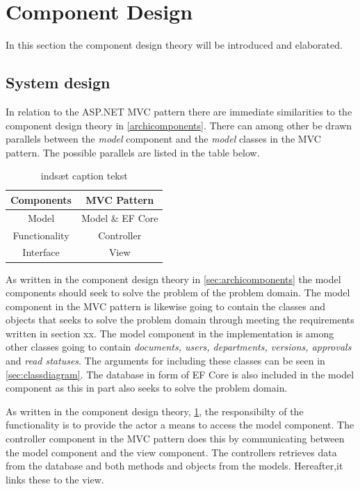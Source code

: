 \section{Component Design} \label{sec:componentdesign}

In this section the component design theory will be introduced and elaborated.



\subsection{System design} \label{sec:systemdesign}

In relation to the ASP.NET MVC pattern there are immediate similarities to the component design theory in \cref{archicomponents}.
There can among other be drawn parallels between the \textit{model} component and the \textit{model} classes in the MVC pattern.
The possible parallels are listed in the table below.

\begin{table}
	\centering
	\begin{tabular}{| c | c | }
	\hline
	\textbf{Components} & \textbf{MVC Pattern} \\
	\hline
	Model & Model \& EF Core \\
	\hline
	Functionality & Controller \\
	\hline
	Interface & View \\
	\hline
\end{tabular}
\caption{{\color{red}indsæt caption tekst}}\label{tab:PatternParallels}
\end{table}

As written in the component design theory in \cref{sec:archicomponents} the model components should seek to solve the problem of the problem domain.
The model component in the MVC pattern is likewise going to contain the classes and objects that seeks to solve the problem domain through meeting the requirements written in {\color{red}section xx}.
The model component in the implementation is among other classes going to contain \textit{documents, users, departments, versions, approvals} and \textit{read statuses}.
The arguments for including these classes can be seen in \cref{sec:classdiagram}.
The database in form of EF Core is also included in the model component as this in part also seeks to solve the problem domain.

As written in the component design theory, \cref{sec:componentdesign}, the responsibilty of the functionality is to provide the actor a means to access the model component.
The controller component in the MVC pattern does this by communicating between the model component and the view component.
The controllers retrieves data from the database and both methods and objects from the models.
Hereafter,it links these to the view.

